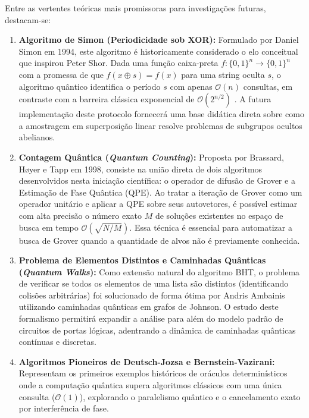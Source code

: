 \documentclass[12pt, a4paper]{article}
\begin{document}
Entre as vertentes teóricas mais promissoras para investigações futuras, destacam-se:

\begin{enumerate}[label=\textbf{\arabic*.}]
    \item \textbf{Algoritmo de Simon (Periodicidade sob XOR):} Formulado por Daniel Simon em 1994, este algoritmo é historicamente considerado o elo conceitual que inspirou Peter Shor. Dada uma função caixa-preta $f: \{0,1\}^n \to \{0,1\}^n$ com a promessa de que $f(x \oplus s) = f(x)$ para uma string oculta $s$, o algoritmo quântico identifica o período $s$ com apenas $\mathcal{O}(n)$ consultas, em contraste com a barreira clássica exponencial de $\mathcal{O}(2^{n/2})$ \cite{nielsen2010}. A futura implementação deste protocolo fornecerá uma base didática direta sobre como a amostragem em superposição linear resolve problemas de subgrupos ocultos abelianos.
    
    \item \textbf{Contagem Quântica (\textit{Quantum Counting}):} Proposta por Brassard, H{\o}yer e Tapp em 1998, consiste na união direta de dois algoritmos desenvolvidos nesta iniciação científica: o operador de difusão de Grover e a Estimação de Fase Quântica (QPE). Ao tratar a iteração de Grover como um operador unitário e aplicar a QPE sobre seus autovetores, é possível estimar com alta precisão o número exato $M$ de soluções existentes no espaço de busca em tempo $\mathcal{O}(\sqrt{N/M})$. Essa técnica é essencial para automatizar a busca de Grover quando a quantidade de alvos não é previamente conhecida.
    
    \item \textbf{Problema de Elementos Distintos e Caminhadas Quânticas (\textit{Quantum Walks}):} Como extensão natural do algoritmo BHT, o problema de verificar se todos os elementos de uma lista são distintos (identificando colisões arbitrárias) foi solucionado de forma ótima por Andris Ambainis utilizando caminhadas quânticas em grafos de Johnson. O estudo deste formalismo permitirá expandir a análise para além do modelo padrão de circuitos de portas lógicas, adentrando a dinâmica de caminhadas quânticas contínuas e discretas.
    
    \item \textbf{Algoritmos Pioneiros de Deutsch-Jozsa e Bernstein-Vazirani:} Representam os primeiros exemplos históricos de oráculos determinísticos onde a computação quântica supera algoritmos clássicos com uma única consulta ($\mathcal{O}(1)$), explorando o paralelismo quântico e o cancelamento exato por interferência de fase.
\end{enumerate}
\end{document}

